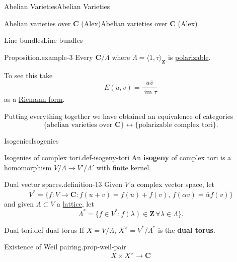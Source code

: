 \documentclass[10pt,]{book}
\newcommand{\terminology}[1]{\textbf{#1}}
\numberwithin{equation}{section}
\newcommand{\ZZ}{\mathbf{Z}}
\newcommand{\CC}{\mathbf{C}}
\DeclareMathOperator{\im}{im}
\begin{document}
\begin{chapterptx}{Abelian Varieties}{}{Abelian Varieties}{}{}
\begin{sectionptx}{Abelian varieties over \(\CC\) (Alex)}{}{Abelian varieties over \(\CC\) (Alex)}{}{}
\begin{subsectionptx}{Line bundles}{}{Line bundles}{}{}
\begin{example}{Proposition.}{example-3}
\hypertarget{p-73}{}%
Every \(\CC/\Lambda\) where \(\Lambda = \langle 1,\tau\rangle_{\ZZ}\) is \hyperref[def-polarizable]{polarizable}.%
\par
\hypertarget{p-74}{}%
To see this take%
\begin{equation*}
E(u,v) = \frac{u\bar v}{\im \tau}
\end{equation*}
as a \hyperref[def-riemann-form]{Riemann form}.%
\end{example}
\hypertarget{p-75}{}%
Putting everything together we have obtained an equivalence of categories%
\begin{equation*}
\{\text{abelian varieties over } \CC\} \leftrightarrow \{\text{polarizable complex tori}\}\text{.}
\end{equation*}
%
\end{subsectionptx}
%
%
\typeout{************************************************}
\typeout{************************************************}
%
\begin{subsectionptx}{Isogenies}{}{Isogenies}{}{}\label{subsection-7}
\begin{definition}{Isogenies of complex tori.}{def-isogeny-tori}%
\hypertarget{p-76}{}%
An \terminology{isogeny} of complex tori is a homomorphism \(V/\Lambda \to V'/\Lambda'\) with finite kernel.%
\end{definition}
\begin{definition}{Dual vector spaces.}{definition-13}%
\hypertarget{p-77}{}%
Given \(V\) a complex vector space, let%
\begin{equation*}
V^* = \{f\colon V\to \CC : f(u+v) = f(u)+f(v),\,f(\alpha v) = \bar \alpha f(v) \}
\end{equation*}
and given \(\Lambda \subset V\) a \hyperref[def-buntes-lattice]{lattice}, let%
\begin{equation*}
\Lambda^* = \{f\in V^* : f(\lambda) \in \ZZ\,\forall \lambda\in \Lambda\}\text{.}
\end{equation*}
%
\end{definition}
\begin{definition}{Dual tori.}{def-dual-torus}%
\hypertarget{p-78}{}%
If \(X = V/\Lambda\), \(X^\vee = V^*/ \Lambda^*\) is the \terminology{dual torus}.%
\end{definition}
\begin{proposition}{Existence of Weil pairing.}{}{prop-weil-pair}%
\hypertarget{p-79}{}%
%
\begin{equation*}
X\times X^\vee \to \CC
\end{equation*}

\end{proposition}
\end{subsectionptx}
\end{sectionptx}
\end{chapterptx}
\end{document}
